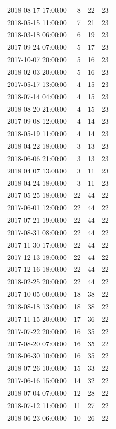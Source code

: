 \begin{tabular}{lrrr}
2018-08-17 17:00:00 & 8 & 22 & 23 \\
2018-05-15 11:00:00 & 7 & 21 & 23 \\
2018-03-18 06:00:00 & 6 & 19 & 23 \\
2017-09-24 07:00:00 & 5 & 17 & 23 \\
2017-10-07 20:00:00 & 5 & 16 & 23 \\
2018-02-03 20:00:00 & 5 & 16 & 23 \\
2017-05-17 13:00:00 & 4 & 15 & 23 \\
2018-07-14 04:00:00 & 4 & 15 & 23 \\
2018-08-20 21:00:00 & 4 & 15 & 23 \\
2017-09-08 12:00:00 & 4 & 14 & 23 \\
2018-05-19 11:00:00 & 4 & 14 & 23 \\
2018-04-22 18:00:00 & 3 & 13 & 23 \\
2018-06-06 21:00:00 & 3 & 13 & 23 \\
2018-04-07 13:00:00 & 3 & 11 & 23 \\
2018-04-24 18:00:00 & 3 & 11 & 23 \\
2017-05-25 18:00:00 & 22 & 44 & 22 \\
2017-06-01 12:00:00 & 22 & 44 & 22 \\
2017-07-21 19:00:00 & 22 & 44 & 22 \\
2017-08-31 08:00:00 & 22 & 44 & 22 \\
2017-11-30 17:00:00 & 22 & 44 & 22 \\
2017-12-13 18:00:00 & 22 & 44 & 22 \\
2017-12-16 18:00:00 & 22 & 44 & 22 \\
2018-02-25 20:00:00 & 22 & 44 & 22 \\
2017-10-05 00:00:00 & 18 & 38 & 22 \\
2018-08-18 13:00:00 & 18 & 38 & 22 \\
2017-11-15 20:00:00 & 17 & 36 & 22 \\
2017-07-22 20:00:00 & 16 & 35 & 22 \\
2017-08-20 07:00:00 & 16 & 35 & 22 \\
2018-06-30 10:00:00 & 16 & 35 & 22 \\
2018-07-26 10:00:00 & 15 & 33 & 22 \\
2017-06-16 15:00:00 & 14 & 32 & 22 \\
2018-07-04 07:00:00 & 12 & 28 & 22 \\
2018-07-12 11:00:00 & 11 & 27 & 22 \\
2018-06-23 06:00:00 & 10 & 26 & 22 \\

\end{tabular}
